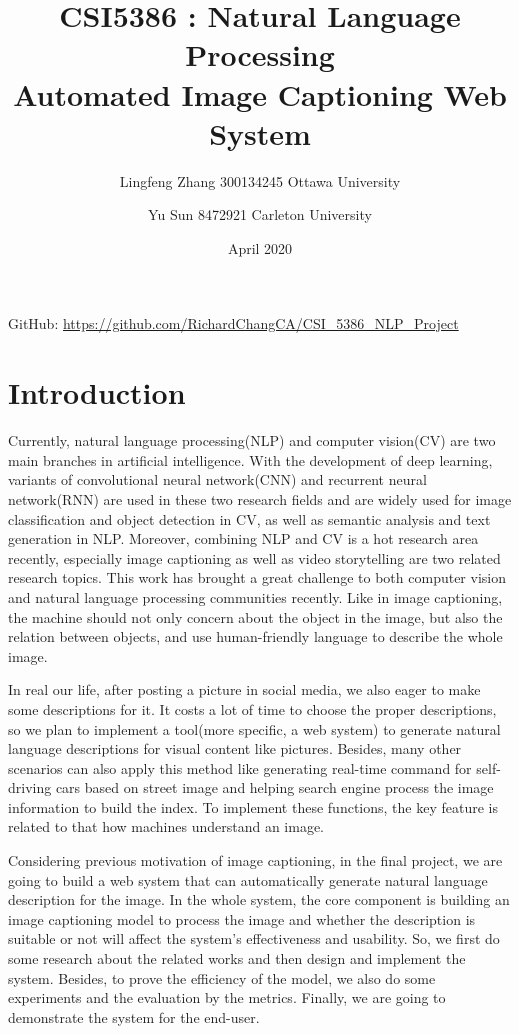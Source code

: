 \documentclass{article}
\title{CSI5386 : Natural Language Processing \\ Automated Image Captioning Web System}
\author{Lingfeng Zhang 300134245 Ottawa University \and
Yu Sun 8472921 Carleton University}
\date{April 2020}
\begin{document}
\maketitle

GitHub: \href{https://github.com/RichardChangCA/CSI_5386_NLP_Project}{\url{https://github.com/RichardChangCA/CSI_5386_NLP_Project}}

\section{Introduction}
Currently, natural language processing(NLP) and computer vision(CV) are two main branches in artificial intelligence. With the development of deep learning, variants of convolutional neural network(CNN) and recurrent neural network(RNN) are used in these two research fields and are widely used for image classification and object detection in CV, as well as semantic analysis and text generation in NLP. Moreover, combining NLP and CV is a hot research area recently, especially image captioning as well as video storytelling are two related research topics. This work has brought a great challenge to both computer vision and natural language processing communities recently. Like in image captioning, the machine should not only concern about the object in the image, but also the relation between objects, and use human-friendly language to describe the whole image.

In real our life, after posting a picture in social media, we also eager to make some descriptions for it. It costs a lot of time to choose the proper descriptions, so we plan to implement a tool(more specific, a web system) to generate natural language descriptions for visual content like pictures. Besides, many other scenarios can also apply this method like generating real-time command for self-driving cars based on street image and helping search engine process the image information to build the index\cite{goodrum2000image}. To implement these functions, the key feature is related to that how machines understand an image.

Considering previous motivation of image captioning, in the final project, we are going to build a web system that can automatically generate natural language description for the image. In the whole system, the core component is building an image captioning model to process the image and whether the description is suitable or not will affect the system's effectiveness and usability. So, we first do some research about the related works and then design and implement the system. Besides, to prove the efficiency of the model, we also do some experiments and the evaluation by the metrics. Finally, we are going to demonstrate the system for the end-user.
\end{document}
